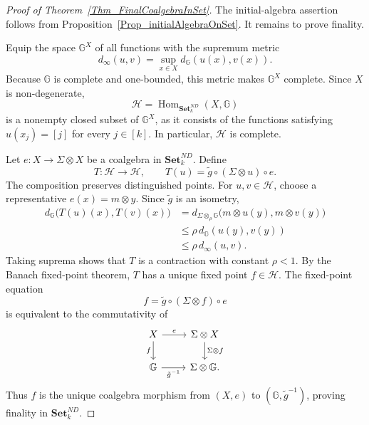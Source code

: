 \documentclass{sn-jnl}%
\theoremstyle{thmstyleone}%
\theoremstyle{thmstyletwo}%
\theoremstyle{thmstylethree}%
\newcommand{\setnd}{\mathbf{Set}_{k}^{ND}}
\newcommand{\M}{\Sigma}
\newcommand{\F}{\M\otimes}
\newcommand{\Fw}{\M\otimes_{\w}}
\newcommand{\G}{\mathbb{G}}
\newcommand{\g}{\tilde{g}^{-1}}
\newcommand{\w}{\rho}
\begin{document}
\begin{proof}[Proof of Theorem~\ref{Thm_FinalCoalgebraInSet}]
The initial-algebra assertion follows from Proposition~\ref{Prop_initialAlgebraOnSet}. It remains to prove finality.

Equip the space $\G^X$ of all functions with the supremum metric
\begin{equation} 
\nonumber
    d_\infty(u,v)=\sup_{x\in X}d_\G(u(x),v(x)).
\end{equation}
Because $\G$ is complete and one-bounded, this metric makes $\G^X$ complete. Since $X$ is non-degenerate, 
\begin{equation} 
\nonumber
    \mathcal H=\operatorname{Hom}_{\setnd}(X,\G)
\end{equation}
is a nonempty closed subset of $\G^X$, as it consists of the functions satisfying $u(x_j)=[j]$ for every $j\in[k]$. In particular, $\mathcal H$ is complete.

Let $e:X\to\F X$ be a coalgebra in $\setnd$. Define
\begin{equation} 
\nonumber
    T:\mathcal H\longrightarrow\mathcal H, \qquad T(u)=\tilde g\circ(\F u)\circ e.
\end{equation}
The composition preserves distinguished points. For $u,v\in\mathcal H$, choose a representative $e(x)=m\otimes y$. Since $\tilde g$ is an isometry,
\begin{equation} 
\nonumber
\begin{aligned}
    d_\G\bigl(T(u)(x),T(v)(x)\bigr)  & = d_{\Fw\G} \bigl(m\otimes u(y),m\otimes v(y)\bigr)\\
        &   \leq \w\,d_\G(u(y),v(y))\\
        &   \leq \w\,d_\infty(u,v).
\end{aligned}
\end{equation}
Taking suprema shows that $T$ is a contraction with constant $\w<1$. By the Banach fixed-point theorem, $T$ has a unique fixed point $f\in\mathcal H$. The fixed-point equation 
\begin{equation} 
\nonumber
    f=\tilde g\circ(\F f)\circ e
\end{equation}
is equivalent to the commutativity of
\begin{equation}
\label{Eqn_comSquareMead}
\begin{tikzcd}
    X \arrow[r,"e"] \arrow[d,"f"'] & \F X \arrow[d,"\F f"]\\
    \G \arrow[r,"\g"']
        & \F\G .
\end{tikzcd}
\end{equation}
Thus $f$ is the unique coalgebra morphism from $(X,e)$ to $(\G,\g)$, proving finality in $\setnd$.
\end{proof}
\end{document}
